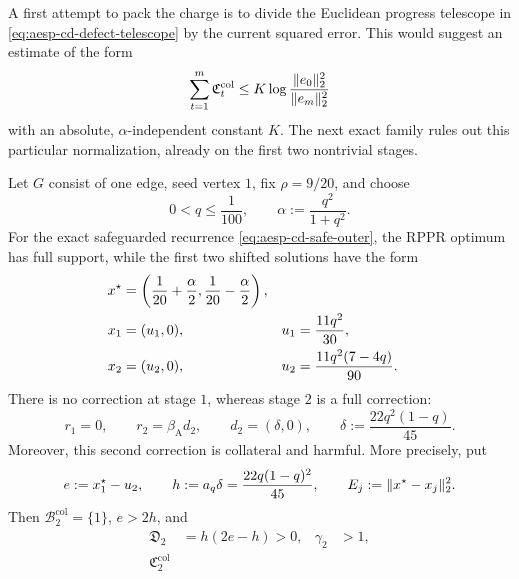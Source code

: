 A first attempt to pack the charge is to divide the Euclidean progress
telescope in \cref{eq:aesp-cd-defect-telescope} by the current squared error.
This would suggest an estimate of the form
\begin{equation}
 \sum_{t=1}^m \mathfrak C_t^{\mathrm{col}}
 \leq K\log\frac{\lVert e_0\rVert_2^2}{\lVert e_m\rVert_2^2}
 \label{eq:aesp-cd-euclidean-packing-candidate}
\end{equation}
with an absolute, $\alpha$-independent constant $K$.  The next exact family
rules out this particular normalization, already on the first two nontrivial
stages.

\begin{proposition}
\label{prop:aesp-cd-euclidean-packing-fails}
Let $G$ consist of one edge, seed vertex $1$, fix $\rho=9/20$, and choose
\begin{equation}
 0<q\leq\frac1{100},
 \qquad
 \alpha:=\frac{q^2}{1+q^2}.
 \label{eq:aesp-cd-euclidean-family-parameters}
\end{equation}
For the exact safeguarded recurrence
\cref{eq:aesp-cd-safe-outer}, the RPPR optimum has full support, while the
first two shifted solutions have the form
\begin{align}
 x^\star
 &=\left(\frac1{20}+\frac\alpha2,
          \frac1{20}-\frac\alpha2\right),
 \label{eq:aesp-cd-euclidean-family-optimum}\\
 x_1&=(u_1,0),
 &u_1&=\frac{11q^2}{30},\notag\\
 x_2&=(u_2,0),
 &u_2&=\frac{11q^2(7-4q)}{90}.
 \label{eq:aesp-cd-euclidean-family-iterates}
\end{align}
There is no correction at stage $1$, whereas stage $2$ is a full correction:
\begin{equation}
 r_1=0,
 \qquad
 r_2=\beta_{\mathrm A}d_2,
 \qquad
 d_2=(\delta,0),
 \qquad
 \delta:=\frac{22q^2(1-q)}{45}.
 \label{eq:aesp-cd-euclidean-family-correction}
\end{equation}
Moreover, this second correction is collateral and harmful.  More precisely,
put
\begin{equation*}
 e:=x_1^\star-u_2,
 \qquad
 h:=a_q\delta=\frac{22q(1-q)^2}{45},
 \qquad
 E_j:=\lVert x^\star-x_j\rVert_2^2.
\end{equation*}
Then $\mathcal B_2^{\mathrm{col}}=\{1\}$, $e>2h$, and
\begin{align}
 \mathfrak D_2&=h(2e-h)>0,
 &\gamma_2&>1,
 \label{eq:aesp-cd-euclidean-family-defect}\\
 \mathfrak C_2^{\mathrm{col}}

\end{align}
\end{proposition}
